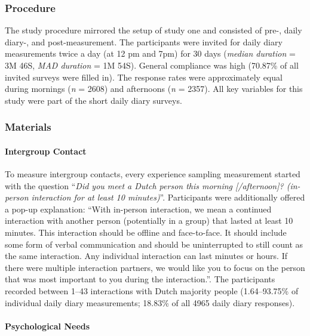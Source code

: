 \subsubsection{Procedure}

The study procedure mirrored the setup of study one and consisted of
pre-, daily diary-, and post-measurement. The participants were invited
for daily diary measurements twice a day (at 12 pm and 7pm) for 30 days
(\textit{median duration} = 3M 46S, \textit{MAD duration} = 1M 54S).
General compliance was high (70.87\% of all invited surveys were filled
in). The response rates were approximately equal during mornings
(\textit{n} = 2608) and afternoons (\textit{n} = 2357). All key
variables for this study were part of the short daily diary surveys.

\subsubsection{Materials}

\paragraph{Intergroup Contact}

To measure intergroup contacts, every experience sampling measurement
started with the question
``\textit{Did you meet a Dutch person this morning [/afternoon]? (in-person interaction for at least 10 minutes)}''.
Participants were additionally offered a pop-up explanation: ``With
in-person interaction, we mean a continued interaction with another
person (potentially in a group) that lasted at least 10 minutes. This
interaction should be offline and face-to-face. It should include some
form of verbal communication and should be uninterrupted to still count
as the same interaction. Any individual interaction can last minutes or
hours. If there were multiple interaction partners, we would like you to
focus on the person that was most important to you during the
interaction.''. The participants recorded between 1--43 interactions
with Dutch majority people (1.64--93.75\% of individual daily diary
measurements; 18.83\% of all 4965 daily diary responses).

\paragraph{Psychological Needs}

